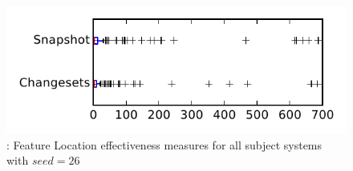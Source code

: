 
\begin{figure}
\centering
\includegraphics[height=0.4\textheight]{figures/flt_seed/rq1_tiny_26}
\caption{\rone: Feature Location effectiveness measures for all subject systems with $seed=26$}
\label{fig:flt_seed:rq1:tiny}
\end{figure}
